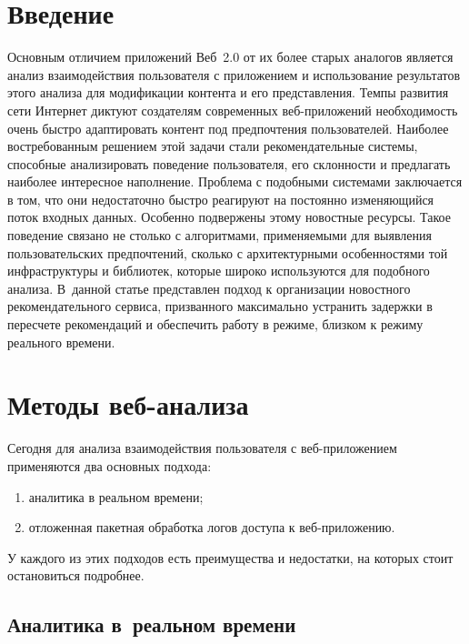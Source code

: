       \begin{multicols}{2}

            \label{st\stat}


\section{Введение}

   Основным отличием приложений Веб~2.0 от их более старых аналогов 
является анализ взаимодействия пользователя с приложением и использование 
результатов этого анализа для модификации контента и его представления. 
Темпы развития сети Интернет диктуют создателям современных 
   веб-при\-ло\-же\-ний необходимость очень быстро адап\-ти\-ро\-вать контент под 
предпочтения пользователей. Наиболее востребованным решением этой задачи 
стали рекомендательные сис\-те\-мы, способные анализировать поведение 
пользователя, его склон\-ности и предлагать наиболее интересное наполнение. 
Проблема с подобными системами заключается в том, что они недостаточно 
быстро реагируют на постоянно изменяющийся поток входных данных. 
Особенно подвержены этому новостные ресурсы. Такое поведение связано не 
столько с алгоритмами, применяемыми для выявления пользовательских 
предпочтений, сколько с архитектурными особенностями той инфраструктуры 
и библиотек, которые широко используются для подобного анализа. В~данной 
статье представлен подход к организации новостного рекомендательного 
сервиса, призванного максимально устранить задержки в пересчете 
рекомендаций и обеспечить работу в режиме, близком к режиму реального 
времени.
   
\section{Методы веб-анализа}

   Сегодня для анализа взаимодействия пользователя с веб-при\-ло\-же\-ни\-ем 
применяются два основных подхода:
   \begin{enumerate}[(1)]
\item аналитика в реальном времени;
\item отложенная пакетная обработка логов доступа к веб-при\-ло\-же\-нию.
   \end{enumerate}
   
   У каждого из этих подходов есть преимущества и недостатки, на которых 
стоит остановиться подробнее.

\subsection{Аналитика в~реальном времени}


\end{multicols}
